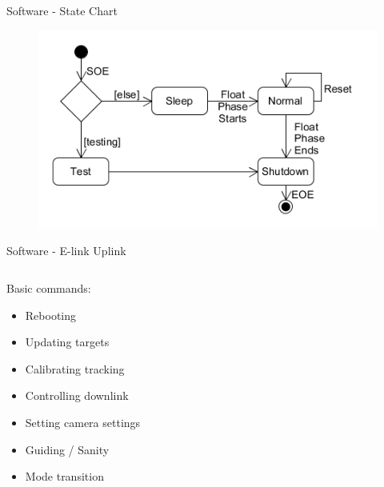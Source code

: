 \documentclass[11pt, aspectratio=169]{beamer}
\begin{document}
    \begin{frame}[c]{Software - State Chart}
        \centering
        \begin{figure}
            \includegraphics[width=.7\textwidth]{software/state-diagram.png}
        \end{figure}
    \end{frame}

    \begin{frame}[c]{Software - E-link Uplink}

        \begin{columns}[t]
            \begin{column}{.5\textwidth}
                Basic commands:
                \begin{itemize}
                    \item Rebooting
                    \item Updating targets
                    \item Calibrating tracking
                    \item Controlling downlink
                    \item Setting camera settings
                    \item Guiding / Sanity
                    \item Mode transition
                \end{itemize}
            \end{column}

            \begin{column}{.5\textwidth}
            \end{column}
        \end{columns}
    \end{frame}
\end{document}
